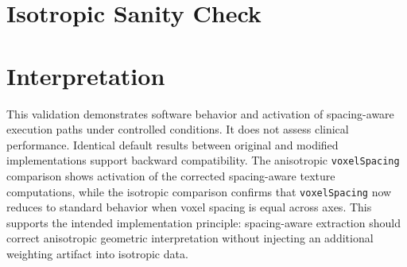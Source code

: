 \documentclass[11pt,a4paper]{article}
\begin{document}
\section*{Isotropic Sanity Check}


\section*{Interpretation}
This validation demonstrates software behavior and activation of spacing-aware execution paths under controlled conditions. It does not assess clinical performance. Identical default results between original and modified implementations support backward compatibility. The anisotropic \texttt{voxelSpacing} comparison shows activation of the corrected spacing-aware texture computations, while the isotropic comparison confirms that \texttt{voxelSpacing} now reduces to standard behavior when voxel spacing is equal across axes. This supports the intended implementation principle: spacing-aware extraction should correct anisotropic geometric interpretation without injecting an additional weighting artifact into isotropic data.
\end{document}
